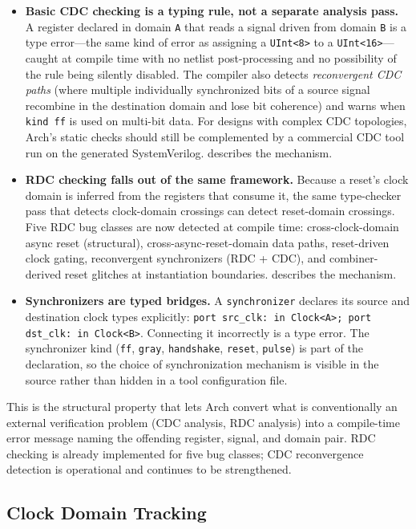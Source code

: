 \documentclass[manuscript]{acmart}
\begin{document}
\begin{itemize}
\item \textbf{Basic CDC checking is a typing rule, not a separate analysis pass.} A register declared in domain \texttt{A} that reads a signal driven from domain \texttt{B} is a type error---the same kind of error as assigning a \texttt{UInt<8>} to a \texttt{UInt<16>}---caught at compile time with no netlist post-processing and no possibility of the rule being silently disabled. The compiler also detects \emph{reconvergent CDC paths} (where multiple individually synchronized bits of a source signal recombine in the destination domain and lose bit coherence) and warns when \texttt{kind ff} is used on multi-bit data. For designs with complex CDC topologies, Arch's static checks should still be complemented by a commercial CDC tool run on the generated SystemVerilog.  describes the mechanism.
\item \textbf{RDC checking falls out of the same framework.} Because a reset's clock domain is inferred from the registers that consume it, the same type-checker pass that detects clock-domain crossings can detect reset-domain crossings. Five RDC bug classes are now detected at compile time: cross-clock-domain async reset (structural), cross-async-reset-domain data paths, reset-driven clock gating, reconvergent synchronizers (RDC + CDC), and combiner-derived reset glitches at instantiation boundaries.  describes the mechanism.
\item \textbf{Synchronizers are typed bridges.} A \texttt{synchronizer} declares its source and destination clock types explicitly: \texttt{port src\_clk: in Clock<A>; port dst\_clk: in Clock<B>}. Connecting it incorrectly is a type error. The synchronizer kind (\texttt{ff}, \texttt{gray}, \texttt{handshake}, \texttt{reset}, \texttt{pulse}) is part of the declaration, so the choice of synchronization mechanism is visible in the source rather than hidden in a tool configuration file.
\end{itemize}

This is the structural property that lets Arch convert what is conventionally an external verification problem (CDC analysis, RDC analysis) into a compile-time error message naming the offending register, signal, and domain pair. RDC checking is already implemented for five bug classes; CDC reconvergence detection is operational and continues to be strengthened.

\subsection{Clock Domain Tracking}
\label{sec:cdc}
\end{document}
